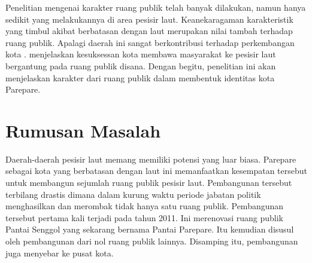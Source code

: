 \documentclass[12pt]{simart} %
\begin{document}
Penelitian mengenai karakter ruang publik telah banyak dilakukan, namun hanya sedikit yang melakukannya di area pesisir laut. Keanekaragaman karakteristik yang timbul akibat berbatasan dengan laut merupakan nilai tambah terhadap ruang publik. Apalagi daerah ini sangat berkontribusi terhadap perkembangan kota \citep{hussein2014}. \cite{hussein2014} menjelaskan kesuksessan kota membawa masyarakat ke pesisir laut bergantung pada ruang publik disana. Dengan begitu, penelitian ini akan menjelaskan karakter dari ruang publik dalam membentuk identitas kota Parepare.

\section{Rumusan Masalah}



Daerah-daerah pesisir laut memang memiliki potensi yang luar biasa. Parepare sebagai kota yang berbatasan dengan laut ini memanfaatkan kesempatan tersebut untuk membangun sejumlah ruang publik pesisir laut. Pembangunan tersebut terbilang drastis dimana dalam kurung waktu periode jabatan politik menghasilkan dan merombak tidak hanya satu ruang publik. Pembangunan tersebut pertama kali terjadi pada tahun 2011. Ini merenovasi ruang publik Pantai Senggol yang sekarang bernama Pantai Parepare. Itu kemudian disusul oleh pembangunan dari nol ruang publik lainnya. Disamping itu, pembangunan juga menyebar ke pusat kota.
\end{document}
